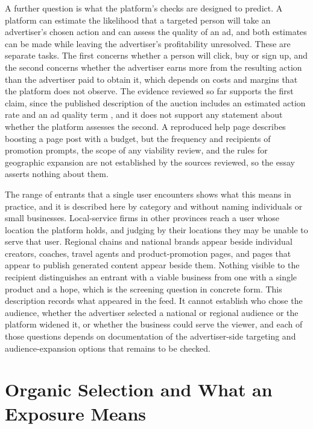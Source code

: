 \documentclass[11pt]{article}
\theoremstyle{definition}
\begin{document}
A further question is what the platform's checks are designed to predict. A platform can estimate the likelihood that a targeted person will take an advertiser's chosen action and can assess the quality of an ad, and both estimates can be made while leaving the advertiser's profitability unresolved. These are separate tasks. The first concerns whether a person will click, buy or sign up, and the second concerns whether the advertiser earns more from the resulting action than the advertiser paid to obtain it, which depends on costs and margins that the platform does not observe. The evidence reviewed so far supports the first claim, since the published description of the auction includes an estimated action rate and an ad quality term \cite{metaauction,instaml}, and it does not support any statement about whether the platform assesses the second. A reproduced help page describes boosting a page post with a budget, but the frequency and recipients of promotion prompts, the scope of any viability review, and the rules for geographic expansion are not established by the sources reviewed, so the essay asserts nothing about them.

The range of entrants that a single user encounters shows what this means in practice, and it is described here by category and without naming individuals or small businesses. Local-service firms in other provinces reach a user whose location the platform holds, and judging by their locations they may be unable to serve that user. Regional chains and national brands appear beside individual creators, coaches, travel agents and product-promotion pages, and pages that appear to publish generated content appear beside them. Nothing visible to the recipient distinguishes an entrant with a viable business from one with a single product and a hope, which is the screening question in concrete form. This description records what appeared in the feed. It cannot establish who chose the audience, whether the advertiser selected a national or regional audience or the platform widened it, or whether the business could serve the viewer, and each of those questions depends on documentation of the advertiser-side targeting and audience-expansion options that remains to be checked.

\section{Organic Selection and What an Exposure Means}
\end{document}

